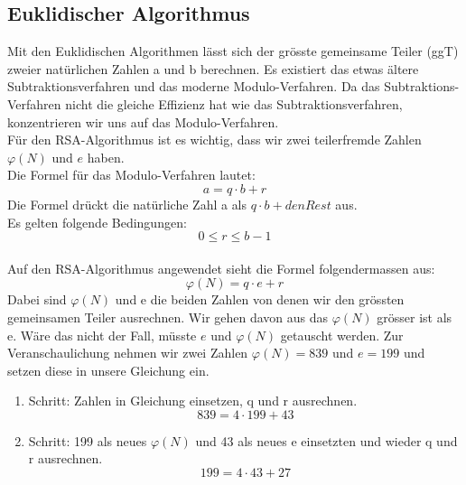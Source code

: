\subsection{Euklidischer Algorithmus}\label{euklidischer_Algorithmus}
Mit den Euklidischen Algorithmen lässt sich der grösste gemeinsame Teiler (ggT) zweier natürlichen Zahlen a und b berechnen. Es existiert das etwas ältere Subtraktionsverfahren und das moderne Modulo-Verfahren. Da das Subtraktions-Verfahren nicht die gleiche Effizienz hat wie das Subtraktionsverfahren, konzentrieren wir uns auf das Modulo-Verfahren. \cite{zahlentheorie_fuer_einsteiger}\\
Für den RSA-Algorithmus ist es wichtig, dass wir zwei teilerfremde Zahlen $\varphi(N)$ und $e$ haben.\\
%
Die Formel für das Modulo-Verfahren lautet:
%
\begin{equation}
  \label{eqn:euklidischer_algo}
  a = q \cdot b + r 
\end{equation}
%
Die Formel drückt die natürliche Zahl a als $ q \cdot b + den Rest $ aus. \\
Es gelten folgende Bedingungen:
\begin{equation*}
  0 \leq r \leq b - 1
\end{equation*}
\\
%
Auf den RSA-Algorithmus angewendet sieht die Formel folgendermassen aus:
\begin{equation}
  \label{eqn:euklidischer_algo_RSA}
  \varphi(N) = q \cdot e + r 
\end{equation}
%
Dabei sind $\varphi(N)$ und e die beiden Zahlen von denen wir den grössten gemeinsamen Teiler ausrechnen.
Wir gehen davon aus das $\varphi(N)$ grösser ist als e. Wäre das nicht der Fall, müsste $ e $ und $ \varphi(N) $  getauscht werden.
Zur Veranschaulichung nehmen wir zwei Zahlen $\varphi(N) = 839$ und $e = 199$ und setzen diese in unsere Gleichung ein.
\begin{enumerate}
  \item Schritt: Zahlen in Gleichung einsetzen, q und r ausrechnen.\\
    \begin{equation*}
      839 = 4 \cdot 199 + 43
    \end{equation*}
  \item Schritt: 199 als neues $\varphi(N)$ und 43 als neues e einsetzten und wieder q und r ausrechnen.\\
    \begin{equation*}
      199 = 4 \cdot 43 + 27
    \end{equation*}
\end{enumerate}
